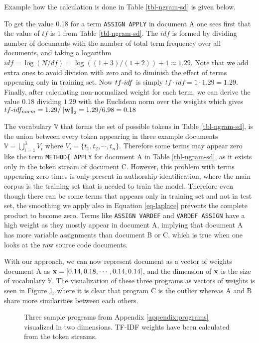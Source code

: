 \noindent
Example how the calculation is done in Table \ref{tbl-ngram-sd} is given below.
\begin{example}
To get the value 0.18 for a term \texttt{ASSIGN APPLY} in document A one sees first that the value of $tf$ is 1 from Table \ref{tbl-ngram-sd}. The $idf$ is formed by dividing number of documents with the number of total term frequency over all documents, and taking a logarithm \ie $idf = \log(N/df) = \log((1+3)/(1+2)) + 1 \approx 1.29$. Note that we add extra ones to avoid division with zero and to diminish the effect of terms appearing only in training set. Now $tf{\text -}idf$ is simply $tf \cdot idf = 1 \cdot 1.29 = 1.29$. Finally, after calculating non-normalized weight for each term, we can derive the value 0.18 dividing $1.29$ with the Euclidean norm over the weights which gives $tf{\text -}idf_{norm} = 1.29 / \! \left\lVert\mathbf{w}\right\rVert_2 = 1.29 / 6.98 = 0.18$
\end{example}

The vocabulary $\mathbb{V}$ that forms the set of possible tokens in Table \ref{tbl-ngram-sd}, is the union between every token appearing in three example documents \ie $\mathbb{V} = \bigcup_{i=1}^{3} V_i$ where $V_i = \{t_1, t_2, \cdots, t_n\}$. Therefore some terms may appear zero like the term \texttt{METHOD\{ APPLY} for document A in Table \ref{tbl-ngram-sd}, as it exists only in the token stream of document C. However, this problem with terms appearing zero times is only present in authorship identification, where the main corpus is the training set that is needed to train the model. Therefore even though there can be some terms that appears only in training set and not in test set, the smoothing we apply also in Equation \ref{eq-laplace} prevents the complete product to become zero. Terms like \texttt{ASSIGN VARDEF} and \texttt{VARDEF ASSIGN} have a high weight as they mostly appear in document A, implying that document A has more variable assignments than document B or C, which is true when one looks at the raw source code documents. 

With our approach, we can now represent document as a vector of weights \eg document A as $\mathbf{x} = [0.14, 0.18, \cdots, 0.14, 0.14]$, and the dimension of $\mathbf{x}$ is the size of vocabulary $\mathbb{V}$. The visualization of these three programs as vectors of weights is seen in Figure \ref{fig-tfidf}, where it is clear that program C is the outlier whereas A and B share more similarities between each others.

\begin{figure}[!h]
\centering
\setlength\figureheight{7cm}
\setlength\figurewidth{10cm}


\caption{Three sample programs from Appendix \ref{appendix:programs} visualized in two dimensions. TF-IDF weights have been calculated from the token streams.} \label{fig-tfidf}
\end{figure}



